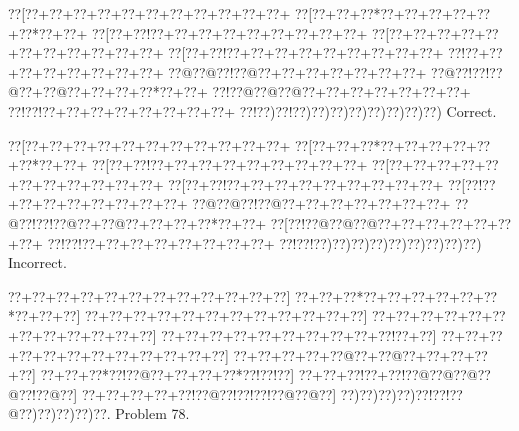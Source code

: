 \documentclass[a5paper]{article}
\begin{document}
\begin{center}
{\goo
\0??[\0??+\0??+\0??+\0??+\0??+\0??+\0??+\0??+\0??+\0??+\0??+
\0??[\0??+\0??+\0??*\0??+\0??+\0??+\0??+\0??+\0??*\0??+\0??+
\0??[\0??+\0??!\0??+\0??+\0??+\0??+\0??+\0??+\0??+\0??+\0??+
\0??[\0??+\0??+\0??+\0??+\0??+\0??+\0??+\0??+\0??+\0??+\0??+
\0??[\0??+\0??!\0??+\0??+\0??+\0??+\0??+\0??+\0??+\0??+\0??+
\0??!\0??+\0??+\0??+\0??+\0??+\0??+\0??+\0??+
\0??@\0??@\0??!\0??@\0??+\0??+\0??+\0??+\0??+\0??+\0??+
\0??@\0??!\0??!\0??@\0??+\0??@\0??+\0??+\0??+\0??*\0??+\0??+
\0??!\0??@\0??@\0??@\0??+\0??+\0??+\0??+\0??+\0??+\0??+
\0??!\0??!\0??+\0??+\0??+\0??+\0??+\0??+\0??+\0??+
\0??!\0??)\0??!\0??)\0??)\0??)\0??)\0??)\0??)\0??)\0??)
}
Correct. 

\end{center}
\begin{center}
{\goo
\0??[\0??+\0??+\0??+\0??+\0??+\0??+\0??+\0??+\0??+\0??+\0??+
\0??[\0??+\0??+\0??*\0??+\0??+\0??+\0??+\0??+\0??*\0??+\0??+
\0??[\0??+\0??!\0??+\0??+\0??+\0??+\0??+\0??+\0??+\0??+\0??+
\0??[\0??+\0??+\0??+\0??+\0??+\0??+\0??+\0??+\0??+\0??+\0??+
\0??[\0??+\0??!\0??+\0??+\0??+\0??+\0??+\0??+\0??+\0??+\0??+
\0??[\0??!\0??+\0??+\0??+\0??+\0??+\0??+\0??+\0??+
\0??@\0??@\0??!\0??@\0??+\0??+\0??+\0??+\0??+\0??+\0??+
\0??@\0??!\0??!\0??@\0??+\0??@\0??+\0??+\0??+\0??*\0??+\0??+
\0??[\0??!\0??@\0??@\0??@\0??+\0??+\0??+\0??+\0??+\0??+\0??+
\0??!\0??!\0??+\0??+\0??+\0??+\0??+\0??+\0??+\0??+
\0??!\0??!\0??)\0??)\0??)\0??)\0??)\0??)\0??)\0??)\0??)
}
Incorrect. 

\end{center}
\newpage
\begin{center}
{\goo
\0??+\0??+\0??+\0??+\0??+\0??+\0??+\0??+\0??+\0??+\0??+\0??]
\0??+\0??+\0??*\0??+\0??+\0??+\0??+\0??+\0??*\0??+\0??+\0??]
\0??+\0??+\0??+\0??+\0??+\0??+\0??+\0??+\0??+\0??+\0??+\0??]
\0??+\0??+\0??+\0??+\0??+\0??+\0??+\0??+\0??+\0??+\0??+\0??]
\0??+\0??+\0??+\0??+\0??+\0??+\0??+\0??+\0??+\0??!\0??+\0??]
\0??+\0??+\0??+\0??+\0??+\0??+\0??+\0??+\0??+\0??+\0??+\0??]
\0??+\0??+\0??+\0??+\0??@\0??+\0??@\0??+\0??+\0??+\0??+\0??]
\0??+\0??+\0??*\0??!\0??@\0??+\0??+\0??+\0??*\0??!\0??!\0??]
\0??+\0??+\0??!\0??+\0??!\0??@\0??@\0??@\0??@\0??!\0??@\0??]
\0??+\0??+\0??+\0??+\0??!\0??@\0??!\0??!\0??!\0??@\0??@\0??]
\0??)\0??)\0??)\0??)\0??!\0??!\0??@\0??)\0??)\0??)\0??)\0??.
}
Problem 78.

\end{center}
\end{document}
